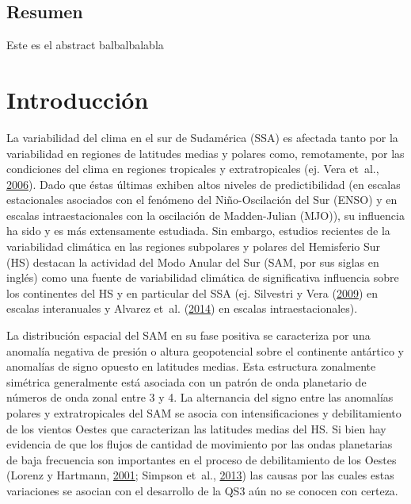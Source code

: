 \documentclass[spanish,a4paper,12pt,oneside]{book}
\begin{document}
\begin{center}\begin{minipage}{\dimexpr\paperwidth-7cm}
\chapter*{Resumen}
Este es el abstract balbalbalabla
\end{minipage}
\end{center}

\setcounter{tocdepth}{3} \tableofcontents

\listoffigures
\newpage

\mainmatter

\chapter{Introducción}\label{introduccion}

La variabilidad del clima en el sur de Sudamérica (SSA) es afectada
tanto por la variabilidad en regiones de latitudes medias y polares
como, remotamente, por las condiciones del clima en regiones tropicales
y extratropicales (ej. Vera et~al.,
\protect\hyperlink{ref-Vera2006}{2006}). Dado que éstas últimas exhiben
altos niveles de predictibilidad (en escalas estacionales asociados con
el fenómeno del Niño-Oscilación del Sur (ENSO) y en escalas
intraestacionales con la oscilación de Madden-Julian (MJO)), su
influencia ha sido y es más extensamente estudiada. Sin embargo,
estudios recientes de la variabilidad climática en las regiones
subpolares y polares del Hemisferio Sur (HS) destacan la actividad del
Modo Anular del Sur (SAM, por sus siglas en inglés) como una fuente de
variabilidad climática de significativa influencia sobre los continentes
del HS y en particular del SSA (ej. Silvestri y Vera
(\protect\hyperlink{ref-Silvestri2009}{2009}) en escalas interanuales y
Alvarez et~al. (\protect\hyperlink{ref-Alvarez2014}{2014}) en escalas
intraestacionales).

La distribución espacial del SAM en su fase positiva se caracteriza por
una anomalía negativa de presión o altura geopotencial sobre el
continente antártico y anomalías de signo opuesto en latitudes medias.
Esta estructura zonalmente simétrica generalmente está asociada con un
patrón de onda planetario de números de onda zonal entre 3 y 4. La
alternancia del signo entre las anomalías polares y extratropicales del
SAM se asocia con intensificaciones y debilitamiento de los vientos
Oestes que caracterizan las latitudes medias del HS. Si bien hay
evidencia de que los flujos de cantidad de movimiento por las ondas
planetarias de baja frecuencia son importantes en el proceso de
debilitamiento de los Oestes (Lorenz y Hartmann,
\protect\hyperlink{ref-Lorenz2001}{2001}; Simpson et~al.,
\protect\hyperlink{ref-Simpson2013}{2013}) las causas por las cuales
estas variaciones se asocian con el desarrollo de la QS3 aún no se
conocen con certeza.
\end{document}
